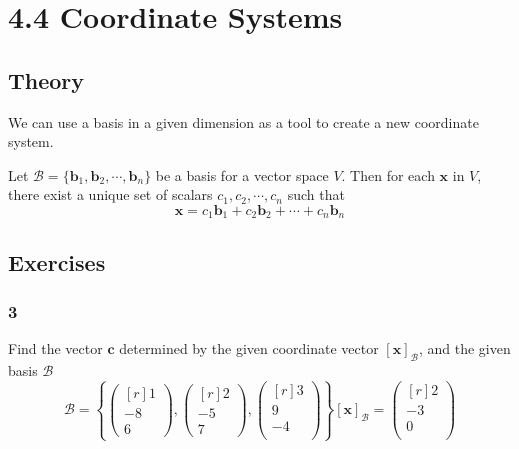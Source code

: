 \section*{4.4 Coordinate Systems}
  \subsection*{Theory}
    We can use a basis in a given dimension as a tool to create a new coordinate system. 
    
    \begin{theorem}\label{The Uniqe Representation Theorem}
      Let $ \mathcal{B} = \{ \mathbf{b}_1,\mathbf{b}_2,\cdots,\mathbf{b}_n \} $ be a basis for a vector space $ V $. Then for each $ \mathbf{x} $ in $ V $, there exist a unique set of scalars $ c_1,c_2,\cdots,c_n $ such that
      \[
      \mathbf{x} = c_1 \mathbf{b}_1+c_2 \mathbf{b}_2+\cdots+c_n \mathbf{b}_n
      \]
    \end{theorem}
  \subsection*{Exercises} 
    \subsubsection*{3}
    Find the vector $ \mathbf{c} $ determined by the given coordinate vector $ \left[ \mathbf{x} \right] _{\mathcal{B}} $, and the given basis $ \mathcal{B} $
    \[ 
      \mathcal{B} = \left\{ 
        \begin{pmatrix*}[r]
         1 \\
         -8 \\
          6
        \end{pmatrix*}, 
        \begin{pmatrix*}[r]
         2 \\
         -5 \\
         7
        \end{pmatrix*}, 
        \begin{pmatrix*}[r]
         3 \\
         9 \\
         -4 \\
        \end{pmatrix*}
        \right\}
        \left[ \mathbf{x} \right] _{\mathcal{B}} = \begin{pmatrix*}[r]
         2 \\
         -3 \\
         0 \\
        \end{pmatrix*}
    \]

